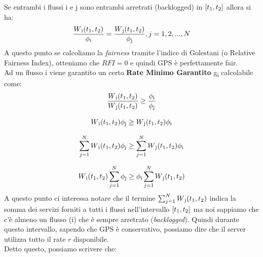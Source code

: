 \documentclass{article}
\begin{document}
Se entrambi i flussi i e j sono entrambi arretrati (backlogged) in \( [t\textsubscript{1}, t\textsubscript{2}] \) allora si ha:
\[ \displaystyle \frac{W\textsubscript{i}(t\textsubscript{1}, t\textsubscript{2})}{\phi\textsubscript{i}} = \frac{W\textsubscript{j}(t\textsubscript{1}, t\textsubscript{2})}{\phi\textsubscript{j}}, j=1,2,...,N
\]
A questo punto se calcoliamo la \textit{fairness} tramite l'indice di Golestani (o Relative Fairness Index), otteniamo che \(RFI = 0\) e quindi GPS è perfettamente fair.\\
Ad un flusso i viene garantito un certo \textbf{Rate Minimo Garantito} g\textsubscript{i} calcolabile come:
\[ \frac{W\textsubscript{i}(t\textsubscript{1}, t\textsubscript{2})}{W\textsubscript{j}(t\textsubscript{1}, t\textsubscript{2})} \geq \frac{\phi\textsubscript{i}}{\phi\textsubscript{j}}\]

\[ W\textsubscript{i}(t\textsubscript{1}, t\textsubscript{2})\phi\textsubscript{j} \geq W\textsubscript{j}(t\textsubscript{1}, t\textsubscript{2})\phi\textsubscript{i}\]

\[ \sum_{j=1}^{N} W\textsubscript{i}(t\textsubscript{1}, t\textsubscript{2})\phi\textsubscript{j} \geq \sum_{j=1}^{N} W\textsubscript{j}(t\textsubscript{1}, t\textsubscript{2})\phi\textsubscript{i} \]

\[ W\textsubscript{i}(t\textsubscript{1}, t\textsubscript{2})\sum_{j=1}^{N} \phi\textsubscript{j} \geq 
\phi\textsubscript{i}\sum_{j=1}^{N} W\textsubscript{j}(t\textsubscript{1}, t\textsubscript{2}) \]
A questo punto ci interessa notare che il termine \( \sum_{j=1}^{N} W\textsubscript{j}(t\textsubscript{1}, t\textsubscript{2}) \) indica la somma dei servizi forniti a tutti i flussi nell'intervallo \( [t\textsubscript{1}, t\textsubscript{2}] \) ma noi sappiamo che c'è almeno un flusso (i) che è sempre arretrato (\textit{backlogged}). Quindi durante questo intervallo, sapendo che GPS è conservativo, possiamo dire che il server utilizza tutto il rate \(r\) disponibile.\\
Detto questo, possiamo scrivere che:
\end{document}
